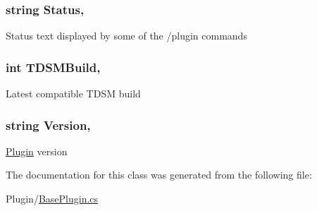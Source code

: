 \subsubsection[{Status}]{\setlength{\rightskip}{0pt plus 5cm}string Status\hspace{0.3cm}{\ttfamily [get]}, {\ttfamily [set]}}\label{classOTA_1_1Plugin_1_1BasePlugin_afdaa27edb811d806bc72f1d53c7334cc}


Status text displayed by some of the /plugin commands 

\hypertarget{classOTA_1_1Plugin_1_1BasePlugin_ad339cda6744dc995542dc552ec525a6e}{}
\subsubsection[{T\+D\+S\+M\+Build}]{\setlength{\rightskip}{0pt plus 5cm}int T\+D\+S\+M\+Build\hspace{0.3cm}{\ttfamily [get]}, {\ttfamily [set]}}\label{classOTA_1_1Plugin_1_1BasePlugin_ad339cda6744dc995542dc552ec525a6e}


Latest compatible T\+D\+S\+M build 

\hypertarget{classOTA_1_1Plugin_1_1BasePlugin_a8ca1a1a001dc102637530f1a11a83224}{}
\subsubsection[{Version}]{\setlength{\rightskip}{0pt plus 5cm}string Version\hspace{0.3cm}{\ttfamily [get]}, {\ttfamily [set]}}\label{classOTA_1_1Plugin_1_1BasePlugin_a8ca1a1a001dc102637530f1a11a83224}


\hyperlink{namespaceOTA_1_1Plugin}{Plugin} version 



The documentation for this class was generated from the following file\+:\begin{DoxyCompactItemize}
\item 
Plugin/\hyperlink{BasePlugin_8cs}{Base\+Plugin.\+cs}\end{DoxyCompactItemize}
